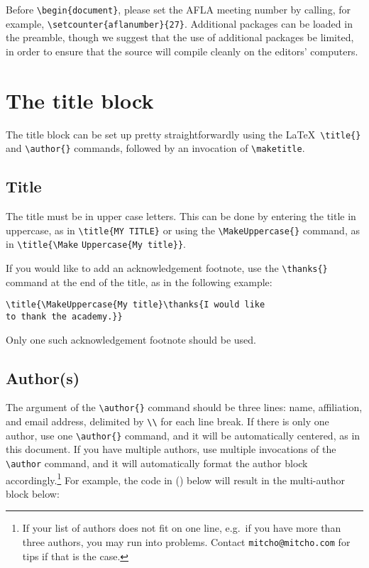 \documentclass{afla}
\begin{document}
Before \verb`\begin{document}`, please set the AFLA meeting number by calling, for example, \verb`\setcounter{aflanumber}{27}`. Additional packages can be loaded in the preamble, though we suggest that the use of additional packages be limited, in order to ensure that the source will compile cleanly on the editors' computers.



\section{The title block}

The title block can be set up pretty straightforwardly using the \LaTeX\ \verb`\title{}` and \verb`\author{}` commands, followed by an invocation of \verb`\maketitle`.

\subsection{Title}

The title must be in upper case letters. This can be done by entering the title in uppercase, as in \verb`\title{MY TITLE}` or using the \verb`\MakeUppercase{}` command, as in \verb`\title{\Make` \verb`Uppercase{My title}}`.

If you would like to add an acknowledgement footnote, use the \verb`\thanks{}` command at the end of the title, as in the following example:

\ex \tt \verb`\title{\MakeUppercase{My title}\thanks{`I would like\\
	to thank the academy.\verb`}}`
\xe
\

\noindent Only one such acknowledgement footnote should be used.

\subsection{Author(s)}

The argument of the \verb`\author{}` command should be three lines: name, affiliation, and email address, delimited by \verb`\\` for each line break. If there is only one author, use one \verb`\author{}` command, and it will be automatically centered, as in this document. If you have multiple authors, use multiple invocations of the \verb`\author` command, and it will automatically format the author block accordingly.\footnote{If your list of authors does not fit on one line, e.g.~if you have more than three authors, you may run into problems. Contact \texttt{mitcho@mitcho.com} for tips if that is the case.} For example, the code in (\nextx) below will result in the multi-author block below:
\end{document}
